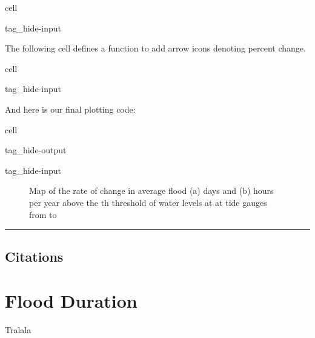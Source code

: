 \documentclass[letterpaper,10pt,english]{jupyterBook}
\begin{document}
\begin{sphinxuseclass}{cell}
\begin{sphinxuseclass}{tag_hide-input}
\end{sphinxuseclass}
\end{sphinxuseclass}
\sphinxAtStartPar
The following cell defines a function to add arrow icons denoting percent change.

\begin{sphinxuseclass}{cell}
\begin{sphinxuseclass}{tag_hide-input}
\end{sphinxuseclass}
\end{sphinxuseclass}
\sphinxAtStartPar
And here is our final plotting code:

\begin{sphinxuseclass}{cell}
\begin{sphinxuseclass}{tag_hide-output}
\begin{sphinxuseclass}{tag_hide-input}
\end{sphinxuseclass}
\end{sphinxuseclass}
\end{sphinxuseclass}
\begin{figure}[htbp]
\centering
\capstart

\noindent{}
\caption{Map of the rate of change in average flood (a) days and (b) hours per year above the th threshold of water levels at at  tide gauges from  to }\label{\detokenize{notebooks/FloodFrequency:mag-fig}}\end{figure}


\bigskip\hrule\bigskip



\subsection{Citations}
\label{\detokenize{notebooks/FloodFrequency:citations}}
\sphinxstepscope


\section{Flood Duration}
\label{\detokenize{notebooks/FloodDuration:flood-duration}}\label{\detokenize{notebooks/FloodDuration::doc}}
\sphinxAtStartPar
Tralala
\end{document}
